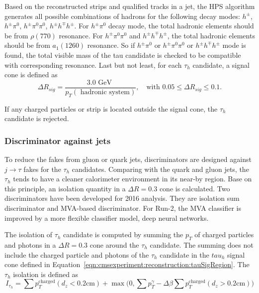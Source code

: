 Based on the reconstructed strips and qualified tracks in a jet, the HPS algorithm generates all possible combinations of hadrons for the following decay modes: $h^\pm$, $h^\pm \pi^0$, $h^\pm \pi^0 \pi^0$, $h^\pm h^\mp h^\pm$. For $h^\pm \pi^0$ decay mode, the total hadronic elements should be from $\rho(770)$ resonance. For $h^\pm \pi^0 \pi^0$ and $h^\pm h^\mp h^\pm$, the total hadronic elements should be from $a_1(1260)$ resonance. So if $h^\pm \pi^0$ or $h^\pm \pi^0 \pi^0$ or $h^\pm h^\mp h^\pm$ mode is found, the total visible mass of the tau candidate is checked to be compatible with corresponding resonance. Last but not least, for each $\tau_h$ candidate, a signal cone is defined as
\begin{equation}
	\Delta R_{sig} = \frac{3.0 \text{ GeV } } { p_T (\text{ hadronic system})  }, \quad \text{with } 0.05 \leq \Delta R_{sig} \leq 0.1.
	\label{eqn:cmsexperiment:reconstruction:tauSigRegion}
\end{equation}

\noindent If any charged particles or strip is located outside the signal cone, the $\tau_h$ candidate is rejected.

\subsubsection{Discriminator against jets}

To reduce the fakes from gluon or quark jets, discriminators are designed against $j\to \tau$ fakes for the $\tau_h$ candidates. Comparing with the quark and gluon jets, the $\tau_h$ tends to have a cleaner calorimeter environment in its near-by region. Base on this principle, an isolation quantity in a $\Delta R = 0.3$ cone is calculated. Two discriminators have been developed for 2016 analysis. They are isolation sum discriminator and MVA-based discriminator. For Run-2, the MVA classifier is improved by a more flexible classifier model, deep neural networks. 

The isolation of $\tau_h$ candidate is computed by summing the $p_T$ of charged particles and photons in a $\Delta R = 0.3$ cone around the $\tau_h$ candidate. The summing does not include the charged particle and photons of the $\tau_h$ candidate in the $tau_h$ signal cone defined in Equation~\ref{eqn:cmsexperiment:reconstruction:tauSigRegion}. The $\tau_h$ isolation is defined as
\begin{equation}
	I_{\tau_h} = \sum p_T^{\text{charged}} (d_z<0.2 \text{cm}) + \max \bigg( 0, \sum p_T^ \gamma - \Delta \beta \sum p_T^{\text{charged}} (d_z>0.2 \text{cm})  \bigg )
    \label{eqn:cmsexperiment:reconstruction:tauIso}
\end{equation}

